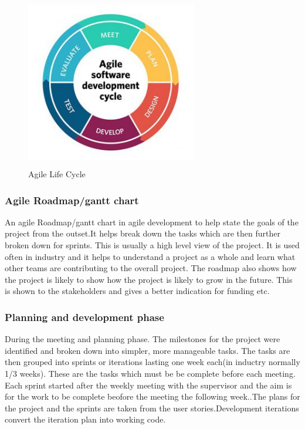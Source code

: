 \begin{figure}[ht!]
    \centering
 \includegraphics[width=75mm, height=75mm,scale=0.5]{img/agile.jpg}
\caption{Agile Life Cycle}
\label{fig:agile}
\end{figure}

\subsubsection{Agile Roadmap/gantt chart}
An agile Roadmap/gantt chart in agile development to help state the goals of the project from the outset.It helps break down the tasks which are then further broken down for sprints. This is usually a high level view of the project.\cite{testPlan} It is used often in industry and it helps to understand a project as a whole and learn what other teams are contributing to the overall project. The roadmap also shows how the project is likely to show how the project is likely to grow in the future. This is shown to the stakeholders and gives a better indication for funding etc.\cite{roadmap_2016}

\subsubsection{Planning and development phase}
During the meeting and planning phase. The milestones for the project were identified and broken down into simpler, more manageable tasks. The tasks are then grouped into sprints or iterations lasting one week each(in inductry normally 1/3 weeks). These are the tasks which must be be complete before each meeting. Each sprint started after the weekly meeting with the supervisor and the aim is for the work to be complete beofore the meeting the following week.\cite{Agile}.The plans for the project and the sprints are taken from the user stories.Development iterations convert the iteration plan into working code.\cite{agile_process}

